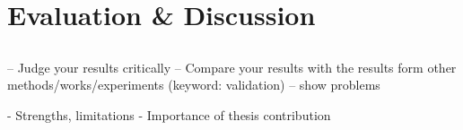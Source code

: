 \chapter{Evaluation \& Discussion}
\label{chap:4}


\section{}
\bigskip





%

-- Judge your results critically
-- Compare your results with the results form other methods/works/experiments (keyword: validation)
-- show problems

- Strengths, limitations
- Importance of thesis contribution

